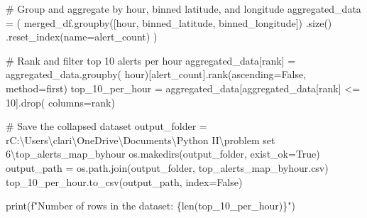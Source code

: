 \documentclass[
  letterpaper,
  DIV=11,
  numbers=noendperiod]{scrartcl}
\newenvironment{Shaded}{\begin{snugshade}}{\end{snugshade}}
\newcommand{\BuiltInTok}[1]{\textcolor[rgb]{0.00,0.23,0.31}{#1}}
\newcommand{\CommentTok}[1]{\textcolor[rgb]{0.37,0.37,0.37}{#1}}
\newcommand{\DecValTok}[1]{\textcolor[rgb]{0.68,0.00,0.00}{#1}}
\newcommand{\NormalTok}[1]{\textcolor[rgb]{0.00,0.23,0.31}{#1}}
\newcommand{\OperatorTok}[1]{\textcolor[rgb]{0.37,0.37,0.37}{#1}}
\newcommand{\SpecialCharTok}[1]{\textcolor[rgb]{0.37,0.37,0.37}{#1}}
\newcommand{\SpecialStringTok}[1]{\textcolor[rgb]{0.13,0.47,0.30}{#1}}
\newcommand{\StringTok}[1]{\textcolor[rgb]{0.13,0.47,0.30}{#1}}
\newcommand{\VariableTok}[1]{\textcolor[rgb]{0.07,0.07,0.07}{#1}}
\newcommand{\VerbatimStringTok}[1]{\textcolor[rgb]{0.13,0.47,0.30}{#1}}
\begin{document}
\begin{Shaded}
\begin{Highlighting}[]
\CommentTok{\# Group and aggregate by hour, binned latitude, and longitude}
\NormalTok{aggregated\_data }\OperatorTok{=}\NormalTok{ (}
\NormalTok{    merged\_df.groupby([}\StringTok{\textquotesingle{}hour\textquotesingle{}}\NormalTok{, }\StringTok{\textquotesingle{}binned\_latitude\textquotesingle{}}\NormalTok{, }\StringTok{\textquotesingle{}binned\_longitude\textquotesingle{}}\NormalTok{])}
\NormalTok{    .size()}
\NormalTok{    .reset\_index(name}\OperatorTok{=}\StringTok{\textquotesingle{}alert\_count\textquotesingle{}}\NormalTok{)}
\NormalTok{)}

\CommentTok{\# Rank and filter top 10 alerts per hour}
\NormalTok{aggregated\_data[}\StringTok{\textquotesingle{}rank\textquotesingle{}}\NormalTok{] }\OperatorTok{=}\NormalTok{ aggregated\_data.groupby(}
    \StringTok{\textquotesingle{}hour\textquotesingle{}}\NormalTok{)[}\StringTok{\textquotesingle{}alert\_count\textquotesingle{}}\NormalTok{].rank(ascending}\OperatorTok{=}\VariableTok{False}\NormalTok{, method}\OperatorTok{=}\StringTok{\textquotesingle{}first\textquotesingle{}}\NormalTok{)}
\NormalTok{top\_10\_per\_hour }\OperatorTok{=}\NormalTok{ aggregated\_data[aggregated\_data[}\StringTok{\textquotesingle{}rank\textquotesingle{}}\NormalTok{] }\OperatorTok{\textless{}=} \DecValTok{10}\NormalTok{].drop(}
\NormalTok{    columns}\OperatorTok{=}\StringTok{\textquotesingle{}rank\textquotesingle{}}\NormalTok{)}

\CommentTok{\# Save the collapsed dataset}
\NormalTok{output\_folder }\OperatorTok{=} \VerbatimStringTok{r\textquotesingle{}C:\textbackslash{}Users\textbackslash{}clari\textbackslash{}OneDrive\textbackslash{}Documents\textbackslash{}Python II\textbackslash{}problem set 6\textbackslash{}top\_alerts\_map\_byhour\textquotesingle{}}
\NormalTok{os.makedirs(output\_folder, exist\_ok}\OperatorTok{=}\VariableTok{True}\NormalTok{)}
\NormalTok{output\_path }\OperatorTok{=}\NormalTok{ os.path.join(output\_folder, }\StringTok{\textquotesingle{}top\_alerts\_map\_byhour.csv\textquotesingle{}}\NormalTok{)}
\NormalTok{top\_10\_per\_hour.to\_csv(output\_path, index}\OperatorTok{=}\VariableTok{False}\NormalTok{)}

\BuiltInTok{print}\NormalTok{(}\SpecialStringTok{f"Number of rows in the dataset: }\SpecialCharTok{\{}\BuiltInTok{len}\NormalTok{(top\_10\_per\_hour)}\SpecialCharTok{\}}\SpecialStringTok{"}\NormalTok{)}
\end{Highlighting}
\end{Shaded}
\end{document}
